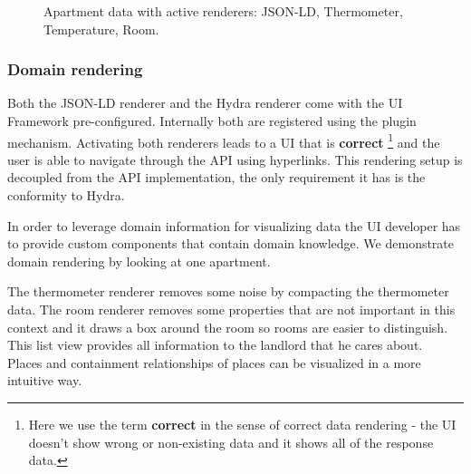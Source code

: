 \begin{figure}[!htb]
  \caption{Apartment data with active renderers: JSON-LD, Thermometer, Temperature, Room.}
\end{figure}

\subsubsection{Domain rendering}
Both the JSON-LD renderer and the Hydra renderer come with the UI Framework pre-configured. Internally both are registered using the plugin mechanism. Activating both renderers leads to a UI that is \textbf{correct} \footnote{Here we use the term \textbf{correct} in the sense of correct data rendering - the UI doesn't show wrong or non-existing data and it shows all of the response data.} and the user is able to navigate through the API using hyperlinks. This rendering setup is decoupled from the API implementation, the only requirement it has is the conformity to Hydra.

In order to leverage domain information for visualizing data the UI developer has to provide custom components that contain domain knowledge. We demonstrate domain rendering by looking at one apartment.

The thermometer renderer removes some noise by compacting the thermometer data. The room renderer removes some properties that are not important in this context and it draws a box around the room so rooms are easier to distinguish. This list view provides all information to the landlord that he cares about. \\ Places and containment relationships of places can be visualized in a more intuitive way.

